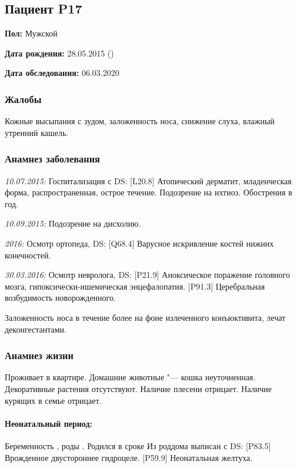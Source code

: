 \documentclass[a4paper,14pt]{extarticle}
\newcommand{\weeks}{нед.}
\newcommand{\pdate}[1]{\emph{#1:} }
\newcommand{\DS}[2]{[#2] #1}
\begin{document}
\subsection*{Пациент P17}

\textbf{Пол:} Мужской

\textbf{Дата рождения:} 28.05.2015 ()

\textbf{Дата обследования:} 06.03.2020

\subsubsection*{Жалобы}

Кожные высыпания с зудом, заложенность носа, снижение слуха, влажный утренний кашель.

\subsubsection*{Анамнез заболевания}

\pdate{10.07.2015} Госпитализация с DS: \DS{Атопический дерматит, младенческая форма, распространенная, острое течение}{L20.8}. Подозрение на ихтиоз. Обострения  в год.

\pdate{10.09.2015} Подозрение на дисхолию.

\pdate{2016} Осмотр ортопеда, DS: \DS{Варусное искривление костей нижних конечностей}{Q68.4}.

\pdate{30.03.2016} Осмотр невролога, DS: \DS{Аноксическое поражение головного мозга, гипоксически-ишемическая энцефалопатия}{P21.9}. \DS{Церебральная возбудимость новорожденного}{P91.3}.

Заложенность носа в течение более  на фоне излеченного конъюктивита, лечат деконгестантами.

\subsubsection*{Анамнез жизни}

Проживает в квартире. Домашние животные "--- кошка неуточненная. Декоративные растения отсутствуют. Наличие плесени отрицает. Наличие курящих в семье отрицает.

\paragraph{Неонатальный период:} Беременность , роды . Родился в сроке \numprint[\weeks]{41} Из роддома выписан с DS: \DS{Врожденное двустороннее гидроцеле}{P83.5}. \DS{Неонатальная желтуха}{P59.9}.
\end{document}
